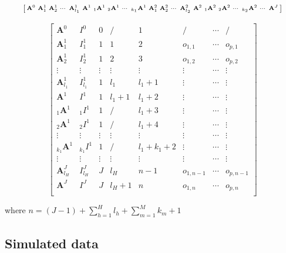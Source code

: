 \documentclass[12pt]{article}
\begin{document}
\begin{equation}
\begin{bsmallmatrix}
\mathbf{A}^0 &\mathbf{A}^1_1 &  \mathbf{A}^1_{2} & \cdots& \mathbf{A}^1_{l_1} & \mathbf{A}^1 & {}_{1}\mathbf{A}^1& {}_{2}\mathbf{A}^1 &\cdots& {}_{k_1}\mathbf{A}^1 & \mathbf{A}^2_1 & \mathbf{A}^2_{2} & \cdots& \mathbf{A}^2_{l_2} & \mathbf{A}^2 & {}_{1}\mathbf{A}^2 &{}_{2}\mathbf{A}^2 &\cdots& {}_{k_2}\mathbf{A}^2 & \cdots & \mathbf{A}^J
\end{bsmallmatrix} 
\label{eq:vectorA}
\end{equation}

\begin{equation}
\left[
\begin{array}{c|c|ccc|ccc}
\mathbf{A}^0 & I^0 & 0 & / & 1 & / & \cdots & /\\
\hline
\mathbf{A}^1_1 & I^1_1 & 1 & 1 & 2 & o_{1, 1} & \cdots & o_{p, 1}\\
\mathbf{A}^1_2 & I^1_2 & 1 & 2 & 3 & o_{1, 2} & \cdots & o_{p, 2}\\
\vdots &\vdots & \vdots &\vdots &\vdots &\vdots &\cdots &\vdots\\
\mathbf{A}^1_{l_1} & I^1_{l_1} & 1 & l_1 & l_1+1 & \vdots & \cdots & \vdots\\
\hline 
\mathbf{A}^1 & I^1 & 1 & l_1 + 1 & l_1 + 2 & \vdots & \cdots & \vdots\\
\hline
{}_{1}\mathbf{A}^1 &{}_{1}I^1 & 1 & / & l_1 + 3 &\vdots & \cdots & \vdots\\
{}_{2}\mathbf{A}^1 &{}_{2}I^1 & 1 & / & l_1 + 4&\vdots & \cdots & \vdots\\
\vdots &\vdots &\vdots  &\vdots &\vdots &\vdots &\cdots &\vdots \\
{}_{k_1}\mathbf{A}^1 &{}_{k_1}I^1 & 1 & / & l_1 +k_1 + 2 &\vdots & \cdots & \vdots\\
\hline
\vdots &\vdots &\vdots  &\vdots &\vdots &\vdots &\cdots &\vdots \\
\mathbf{A}^J_{l_H} & I^J_{l_H} & J & l_H & n-1 &o_{1, n-1}& \cdots & o_{p, n-1}\\
\mathbf{A}^J & I^J & J & l_H + 1 & n & o_{1, n}& \cdots & o_{p, n}\\
\end{array}
\right]
\label{eq:data-structure}
\end{equation}

where \(n = (J-1) + \sum_{h = 1}^H l_h + \sum_{m = 1}^M k_m + 1\)

\hypertarget{simulated-data}{%
\subsection{Simulated data}\label{simulated-data}}
\end{document}

